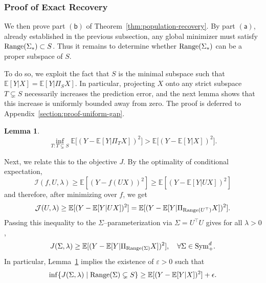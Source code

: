 \documentclass[sn-mathphys-num]{sn-jnl}%
\numberwithin{equation}{section}
\newcommand{\E}{\mathbb{E}}
\newtheorem{lemma}{Lemma}
\newcommand{\eps}{\epsilon}
\newcommand{\Range}{{\rm Range}}
\newcommand{\Sym}{{\rm \mathrm{Sym}}}
\theoremstyle{thmstyleone}%
\theoremstyle{thmstyletwo}%
\theoremstyle{thmstylethree}%
\begin{document}



\subsubsection{Proof of Exact Recovery} 

\indent\indent
We then prove part $\mathsf{(b)}$ of Theorem~\ref{thm:population-recovery}. By part $\mathsf{(a)}$, already established in the previous subsection, 
any global minimizer must satisfy $\Range(\Sigma_*) \subset S$. Thus it remains to determine whether $\Range(\Sigma_*)$ 
can be a proper subspace of $S$. 

To do so, we exploit the fact that $S$ is the minimal subspace such that 
$\E[Y | X] = \E[Y | \Pi_S X]$. 
In particular, projecting $X$ onto any strict subspace $T \subsetneq S$ necessarily increases the prediction error, and the next lemma shows that this increase is uniformly bounded away from zero. The proof is deferred to Appendix~\ref{section:proof-uniform-gap}.
\vspace{.5em} 
\begin{lemma}
\label{lem:uniform-gap}
\begin{equation*}
	\inf_{T:  T\subsetneq S} \E\bigl[(Y - \E[Y | \Pi_T X])^2\bigr] >  \E\bigl[(Y - \E[Y | X])^2\bigr]. 
\end{equation*} 
\end{lemma} 


\vspace{.5em}

Next, we relate this to the objective $J$. By the optimality of conditional expectation,  
\begin{equation*}
\mathcal{I}(f, U, \lambda) \ge \E[(Y- f(UX))^2] \ge \E[(Y - \E[Y|UX])^2]
\end{equation*}
and therefore, after minimizing over $f$, we get 
\begin{equation*}
	\mathcal{J}(U, \lambda) \ge \E[(Y - \E[Y|UX])^2] = \E[(Y - \E[Y|\Pi_{\Range(U^\top)}X])^2].
\end{equation*}
Passing this inequality to the $\Sigma$–parameterization via $\Sigma = U^\top U$ gives for all $\lambda > 0$,
\begin{equation*}
	J(\Sigma, \lambda) \ge \E[(Y - \E[Y|\Pi_{\Range(\Sigma)}X])^2],~~~\forall \Sigma \in \Sym_+^d.
\end{equation*} 
In particular, Lemma~\ref{lem:uniform-gap} implies the existence of $\varepsilon>0$ such that
\begin{equation*}
	\inf \{J(\Sigma, \lambda) \mid \Range(\Sigma) \subsetneq S \} \ge  \E[(Y - \E[Y|X])^2] + \eps. 
\end{equation*}  
\end{document}
